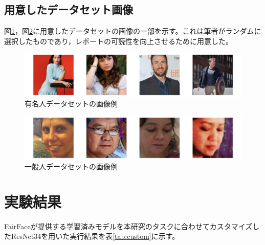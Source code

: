 \documentclass[a4paper,11pt,titlepage]{jsarticle}
\begin{document}


\subsection{用意したデータセット画像}
図\ref{fig:good_ex}，図\ref{fig:normal_ex}に用意したデータセットの画像の一部を示す。これは筆者がランダムに選択したものであり，レポートの可読性を向上させるために用意した。
\begin{figure}[htbp]
    \centering
    \includegraphics[width=1.1\textwidth]{ex_good_dataset.png}
    \caption{有名人データセットの画像例}
    \label{fig:good_ex}
\end{figure}
\begin{figure}[H]
    \centering
    \includegraphics[width=1.1\textwidth]{ex_normal_dataset.png}
    \caption{一般人データセットの画像例}
    \label{fig:normal_ex}
\end{figure}


\section{実験結果}
FairFaceが提供する学習済みモデルを本研究のタスクに合わせてカスタマイズしたResNet34を用いた実行結果を表\ref{tab:custom}に示す。
\end{document}

